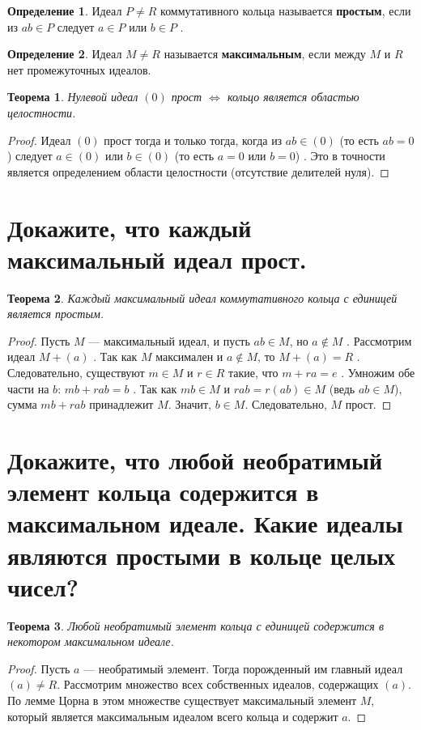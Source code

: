 \documentclass[12pt, a4paper]{article}
\theoremstyle{definition}
\newtheorem{definition}{Определение}[section]
\theoremstyle{plain}
\newtheorem{theorem}{Теорема}[section]
\begin{document}
	\begin{definition}
		Идеал $P \neq R$ коммутативного кольца называется \textbf{простым}, если из $ab \in P$ следует $a \in P$ или $b \in P$ .
	\end{definition}
	
	\begin{definition}
		Идеал $M \neq R$ называется \textbf{максимальным}, если между $M$ и $R$ нет промежуточных идеалов.
	\end{definition}
	
	\begin{theorem}
		Нулевой идеал $(0)$ прост $\iff$ кольцо является областью целостности.
	\end{theorem}
	\begin{proof}
		Идеал $(0)$ прост тогда и только тогда, когда из $ab \in (0)$ (то есть $ab=0$) следует $a \in (0)$ или $b \in (0)$ (то есть $a=0$ или $b=0$) . Это в точности является определением области целостности (отсутствие делителей нуля).
	\end{proof}
	
	\newpage
	
	\section{Докажите, что каждый максимальный идеал прост.}
	
	\begin{theorem}
		Каждый максимальный идеал коммутативного кольца с единицей является простым.
	\end{theorem}
	\begin{proof}
		Пусть $M$ — максимальный идеал, и пусть $ab \in M$, но $a \notin M$ . Рассмотрим идеал $M+(a)$ . Так как $M$ максимален и $a \notin M$, то $M+(a) = R$ . Следовательно, существуют $m \in M$ и $r \in R$ такие, что $m+ra=e$ . Умножим обе части на $b$: $mb+rab=b$ . Так как $mb \in M$ и $rab = r(ab) \in M$ (ведь $ab \in M$), сумма $mb+rab$ принадлежит $M$. Значит, $b \in M$. Следовательно, $M$ прост.
	\end{proof}
	
	\newpage
	
	\section{Докажите, что любой необратимый элемент кольца содержится в максимальном идеале. Какие идеалы являются простыми в кольце целых чисел?}
	
	\begin{theorem}
		Любой необратимый элемент кольца с единицей содержится в некотором максимальном идеале.
	\end{theorem}
	\begin{proof}
		Пусть $a$ — необратимый элемент. Тогда порожденный им главный идеал $(a) \neq R$. Рассмотрим множество всех собственных идеалов, содержащих $(a)$. По лемме Цорна в этом множестве существует максимальный элемент $M$, который является максимальным идеалом всего кольца и содержит $a$.
	\end{proof}
	
\end{document}
